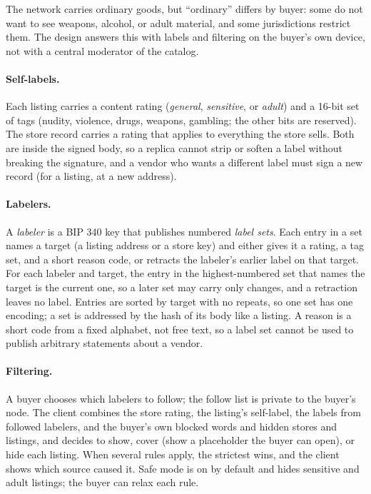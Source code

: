 The network carries ordinary goods, but ``ordinary'' differs by buyer: some do not want to see weapons, alcohol, or adult material, and some jurisdictions restrict them. The design answers this with labels and filtering on the buyer's own device, not with a central moderator of the catalog.

\paragraph{Self-labels.} Each listing carries a content rating (\emph{general}, \emph{sensitive}, or \emph{adult}) and a 16-bit set of tags (nudity, violence, drugs, weapons, gambling; the other bits are reserved). The store record carries a rating that applies to everything the store sells. Both are inside the signed body, so a replica cannot strip or soften a label without breaking the signature, and a vendor who wants a different label must sign a new record (for a listing, at a new address).

\paragraph{Labelers.} A \emph{labeler} is a BIP 340 key that publishes numbered \emph{label sets}. Each entry in a set names a target (a listing address or a store key) and either gives it a rating, a tag set, and a short reason code, or retracts the labeler's earlier label on that target. For each labeler and target, the entry in the highest-numbered set that names the target is the current one, so a later set may carry only changes, and a retraction leaves no label. Entries are sorted by target with no repeats, so one set has one encoding; a set is addressed by the hash of its body like a listing. A reason is a short code from a fixed alphabet, not free text, so a label set cannot be used to publish arbitrary statements about a vendor.

\paragraph{Filtering.} A buyer chooses which labelers to follow; the follow list is private to the buyer's node. The client combines the store rating, the listing's self-label, the labels from followed labelers, and the buyer's own blocked words and hidden stores and listings, and decides to show, cover (show a placeholder the buyer can open), or hide each listing. When several rules apply, the strictest wins, and the client shows which source caused it. Safe mode is on by default and hides sensitive and adult listings; the buyer can relax each rule.

